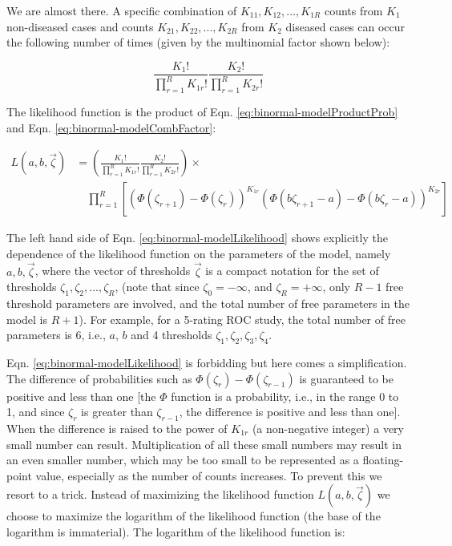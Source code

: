 \documentclass[
]{book}
\begin{document}
We are almost there. A specific combination of \(K_{11},K_{12},...,K_{1R}\) counts from \(K_1\) non-diseased cases and counts \(K_{21},K_{22},...,K_{2R}\) from \(K_2\) diseased cases can occur the following number of times (given by the multinomial factor shown below):

\begin{equation} 
\frac{K_1!}{\prod_{r=1}^{R}K_{1r}!}\frac{K_2!}{\prod_{r=1}^{R}K_{2r}!}
\label{eq:binormal-modelCombFactor}
\end{equation}

The likelihood function is the product of Eqn. \eqref{eq:binormal-modelProductProb} and Eqn. \eqref{eq:binormal-modelCombFactor}:

\begin{equation} 
\begin{split}
L\left ( a,b,\overrightarrow{\zeta} \right ) &= \left (\frac{K_1!}{\prod_{r=1}^{R}K_{1r}!}\frac{K_2!}{\prod_{r=1}^{R}K_{2r}!}  \right ) \times \\
&\quad\prod_{r=1}^{R}\left [\left (\Phi\left ( \zeta_{r+1}  \right ) - \Phi\left ( \zeta_r  \right )  \right )^{K_{1r}} \left (\Phi\left ( b\zeta_{r+1}-a  \right ) - \Phi\left ( b\zeta_r-a  \right )  \right )^{K_{2r}}  \right ]
\end{split}
\label{eq:binormal-modelLikelihood}
\end{equation}

The left hand side of Eqn. \eqref{eq:binormal-modelLikelihood} shows explicitly the dependence of the likelihood function on the parameters of the model, namely \(a,b,\overrightarrow{\zeta}\), where the vector of thresholds \(\overrightarrow{\zeta}\) is a compact notation for the set of thresholds \(\zeta_1,\zeta_2,...,\zeta_R\), (note that since \(\zeta_0 = -\infty\), and \(\zeta_R = +\infty\), only \(R-1\) free threshold parameters are involved, and the total number of free parameters in the model is \(R+1\)). For example, for a 5-rating ROC study, the total number of free parameters is 6, i.e., \(a\), \(b\) and 4 thresholds \(\zeta_1,\zeta_2,\zeta_3,\zeta_4\).

Eqn. \eqref{eq:binormal-modelLikelihood} is forbidding but here comes a simplification. The difference of probabilities such as \(\Phi\left ( \zeta_r \right )-\Phi\left ( \zeta_{r-1} \right )\) is guaranteed to be positive and less than one {[}the \(\Phi\) function is a probability, i.e., in the range 0 to 1, and since \(\zeta_r\) is greater than \(\zeta_{r-1}\), the difference is positive and less than one{]}. When the difference is raised to the power of \(K_{1r}\) (a non-negative integer) a very small number can result. Multiplication of all these small numbers may result in an even smaller number, which may be too small to be represented as a floating-point value, especially as the number of counts increases. To prevent this we resort to a trick. Instead of maximizing the likelihood function \(L\left ( a,b,\overrightarrow{\zeta} \right )\) we choose to maximize the logarithm of the likelihood function (the base of the logarithm is immaterial). The logarithm of the likelihood function is:
\end{document}
